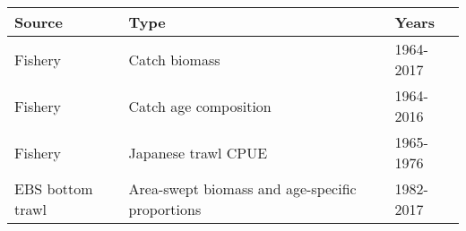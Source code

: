 \begin{longtable}[]{@{}lll@{}}
\toprule
\begin{minipage}[b]{0.26\columnwidth}\raggedright
Source\strut
\end{minipage} & \begin{minipage}[b]{0.22\columnwidth}\raggedright
Type\strut
\end{minipage} & \begin{minipage}[b]{0.43\columnwidth}\raggedright
Years\strut
\end{minipage}\tabularnewline
\midrule
\endhead
\begin{minipage}[t]{0.26\columnwidth}\raggedright
Fishery\strut
\end{minipage} & \begin{minipage}[t]{0.22\columnwidth}\raggedright
Catch biomass\strut
\end{minipage} & \begin{minipage}[t]{0.43\columnwidth}\raggedright
1964-2017\strut
\end{minipage}\tabularnewline
\begin{minipage}[t]{0.26\columnwidth}\raggedright
Fishery\strut
\end{minipage} & \begin{minipage}[t]{0.22\columnwidth}\raggedright
Catch age composition\strut
\end{minipage} & \begin{minipage}[t]{0.43\columnwidth}\raggedright
1964-2016\strut
\end{minipage}\tabularnewline
\begin{minipage}[t]{0.26\columnwidth}\raggedright
Fishery\strut
\end{minipage} & \begin{minipage}[t]{0.22\columnwidth}\raggedright
Japanese trawl CPUE\strut
\end{minipage} & \begin{minipage}[t]{0.43\columnwidth}\raggedright
1965-1976\strut
\end{minipage}\tabularnewline
\begin{minipage}[t]{0.26\columnwidth}\raggedright
EBS bottom trawl\strut
\end{minipage} & \begin{minipage}[t]{0.22\columnwidth}\raggedright
Area-swept biomass and age-specific proportions\strut
\end{minipage} & \begin{minipage}[t]{0.43\columnwidth}\raggedright
1982-2017\strut
\end{minipage}\tabularnewline

\end{longtable}
